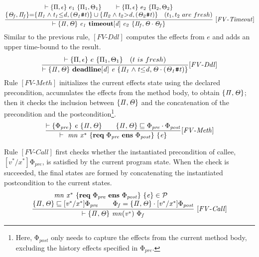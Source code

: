 \documentclass[acmsmall,10pt,review]{acmart}
\newcommand{\effect}{{\ensuremath{\mathrm{\Phi}}}}
\newcommand{\code}[1]{{\tt{\ensuremath{\m{#1}}}}}
\newcommand{\CONTAIN}{\sqsubseteq}
\newcommand{\m}{\mathit}
\newcommand{\mysharp}{{\mathrel{\texttt{\#}}}}
\begin{document}
{{{\begin{gather*}
  \code{\frac{
    \begin{matrix}
      \vdash \{\Pi, \epsilon \}\ e_1 \ \{  \Pi_1, \Theta_1\} 
      \qquad 
      \vdash \{ \Pi, \epsilon \}\ e_2 \ \{  \Pi_2, \Theta_2 \} 
      \\
      \s{\Theta_f, \Pi_f} {=} \s{\Pi_1  \wedge t_1{\leq}d, (\Theta_1\mysharp t)}
      \cup 
  \s{\Pi_2  \wedge t_2{>}d,  (\Theta_2\mysharp t)}   
  \quad (t_1, t_2\ are\ fresh)     
\end{matrix}
  }
  {\vdash \s{ \Pi, \Theta} \  
  e_1\ \textbf{timeout} [d] \  e_2
   \ \s{\Pi_f, \Theta \cdot \Theta_f} } \   {[FV\text{-}Timeout]}} 
\end{gather*}}}
Similar to the previous rule, \code{[FV\text{-}Ddl]} computes the effects 
from \code{e} and adds an upper time-bound to the result. 
{{\small\begin{gather*}
  \code{\frac{
    \begin{matrix}
      \vdash \{ \Pi, \epsilon\}\ e \ \{  \Pi_1, \Theta_1\} 
  \quad (t\ is\ fresh)     
\end{matrix}
  }
  {\vdash \s{ \Pi, \Theta} \  
  \textbf{deadline}  [d] \ e 
   \ \s{\Pi_1  \wedge t{\leq}d, \Theta  \cdot (\Theta_1\mysharp t)} }   
    {[FV\text{-}Ddl]}} 
  \end{gather*}}}
  Rule \code{[FV\text{-}Meth]} initializes the current effects state 
using the declared precondition, accumulates the effects from the method body, 
to obtain \code{ \s{\Pi, \Theta}}; then  it
checks the  inclusion between \code{ \s{\Pi, \Theta}} and the concatenation of 
the precondition and the postcondition\footnote{Here, 
\code{\effect_{post}} only needs to capture the effects from the current method body, excluding the history effects specified in \code{\effect_{pre}}. }.
  {{\small\begin{gather*}
\code{\frac{  \vdash \s{\effect_{pre}}
 \ e \  \{ \Pi, \Theta \} \qquad   \{ \Pi, \Theta \} \CONTAIN  
 \effect_{pre} \cdot \effect_{post}}{  \vdash  \ mn  \ {x^*}\ \{\textbf{req}\ \effect_{pre}\ 
  \textbf{ens}\  \effect_{post}\} \ \{ e \}}   {[FV\text{-}Meth]}}  
  \end{gather*}}}


Rule \code{[FV\text{-}Call]} first checks whether the instantiated 
  precondition of callee, \code{[v^*/x^*]\effect_{pre}}, is satisfied by 
  the current program state. When the check is succeeded, the final states are 
  formed by concatenating the  
  instantiated postcondition to the current states. 
{{\small\begin{gather*}
\code{\frac{
\begin{matrix}
{\code{  mn  \ {x^*}\ \{\textbf{req}\ \effect_{pre}\ \textbf{ens}\  \effect_{post}\} \ \{ e \} \in \mathcal{P}\ \ }}
\\
\text{\code{ \s{ \Pi, \Theta} \CONTAIN [v^*/x^*] \effect_{pre}   
\qquad   \effect_f =  \s{ \Pi, \Theta} \cdot  [v^*/x^*]\effect_{post}}}
\end{matrix}}
{\vdash \s{ \Pi, \Theta} \ mn({v^*})  \ 
\effect_f} \ {[FV\text{-}Call]}}
\end{gather*}}}


}
\end{document}
